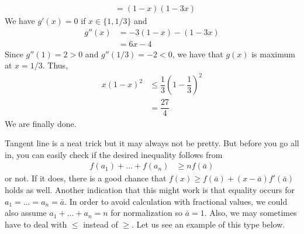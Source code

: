 \documentclass[inequalities.tex]{subfile}
\begin{document}
\begin{problem}
\begin{solution}
\begin{align*}
								& = (1-x)(1-3x)
						\end{align*}
					We have $g'(x)=0$ if $x\in\{1,1/3\}$ and
						\begin{align*}
							g''(x)
								& = -3(1-x)-(1-3x)\\
								& = 6x-4
						\end{align*}
					Since $g''(1)=2>0$ and $g''(1/3)=-2<0$, we have that $g(x)$ is maximum at $x=1/3$. Thus,
						\begin{align*}
							x(1-x)^{2}
								& \leq \dfrac{1}{3}\left(1-\dfrac{1}{3}\right)^{2}\\
								& = \dfrac{27}{4}
						\end{align*}
					We are finally done.
				\end{solution}
			
				\begin{remark}
					Tangent line is a neat trick but it may always not be pretty. But before you go all in, you can easily check if the desired inequality follows from
						\begin{align*}
							f(a_{1})+\ldots+f(a_{n})
								& \geq nf(\bar{a})
						\end{align*}
					or not. If it does, there is a good chance that $f(x)\geq f(\bar{a})+(x-\bar{a})f'(\bar{a})$ holds as well. Another indication that this might work is that equality occurs for $a_{1}=\ldots=a_{n}=\bar{a}$. In order to avoid calculation with fractional values, we could also assume $a_{1}+\ldots+a_{n}=n$ for normalization so $\bar{a}=1$. Also, we may sometimes have to deal with $\leq$ instead of $\geq$. Let us see an example of this type below.
				\end{remark}
		\end{problem}
	
\end{document}
